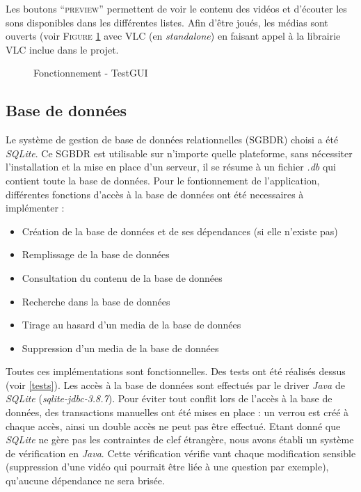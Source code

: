 Les boutons ``\textsc{preview}'' permettent de voir le contenu des vidéos et d'écouter les sons disponibles dans les différentes listes. Afin d'être joués, les médias sont ouverts (voir \textsc{Figure} \ref{VLC} avec VLC (en \textit{standalone}) en faisant appel à la librairie VLC inclue dans le projet.

\begin{figure}[!ht]
\begin{center}
  \caption{Fonctionnement - TestGUI}
  \label{VLC} 
\end{center}
\end{figure}

\subsection{Base de données}\label{BDD}

Le système de gestion de base de données relationnelles (SGBDR) choisi a été \textit{SQLite}. Ce SGBDR est utilisable sur n'importe quelle plateforme, sans nécessiter l'installation et la mise en place d'un serveur, il se résume à un fichier \textit{.db} qui contient toute la base de données.
Pour le fontionnement de l'application, différentes fonctions d'accès à la base de données ont été necessaires à implémenter :
\begin{itemize}
 \item Création de la base de données et de ses dépendances (si elle n'existe pas)
 \item Remplissage de la base de données
 \item Consultation du contenu de la base de données
 \item Recherche dans la base de données
 \item Tirage au hasard d'un media de la base de données
 \item Suppression d'un media de la base de données
\end{itemize}
Toutes ces implémentations sont fonctionnelles. Des tests ont été réalisés dessus (voir \ref{tests}).
Les accès à la base de données sont effectués par le driver \textit{Java} de \textit{SQLite} (\textit{sqlite-jdbc-3.8.7}).
Pour éviter tout conflit lors de l'accès à la base de données, des transactions manuelles ont été mises en place : un verrou est créé à chaque accès, ainsi un double accès ne peut pas être effectué.
Etant donné que \textit{SQLite} ne gère pas les contraintes de clef étrangère, nous avons établi un système de vérification en \textit{Java}. Cette vérification vérifie vant chaque modification sensible (suppression d'une vidéo qui pourrait être liée à une question par exemple), qu'aucune dépendance ne sera brisée.


